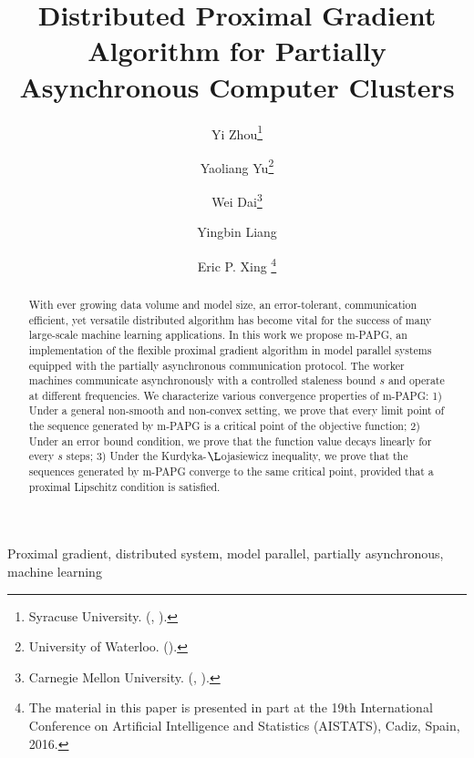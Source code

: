 \documentclass[leqno,onefignum,onetabnum]{siamart0516}
\title{Distributed Proximal Gradient Algorithm for Partially Asynchronous Computer Clusters}%
\author{Yi Zhou\thanks{Syracuse University. (\email{yzhou35@syr.edu}, \email{yliang06@syr.edu}).}  
   \and  Yaoliang Yu\thanks{University of Waterloo. (\email{yaoliang.yu@uwaterloo.ca}).} 
   \and  Wei Dai\thanks{Carnegie Mellon University. (\email{wdai@cs.cmu.edu}, \email{epxing@cs.cmu.edu}).} 
   \and  Yingbin Liang%
   \footnotemark[1]
   \and  Eric P. Xing%
   \footnotemark[3]
   \thanks{The material in this paper is presented in part at the 19th International Conference on Artificial Intelligence and Statistics (AISTATS), Cadiz, Spain, 2016.
   }  
}
\newcommand{\mspg}{\textsf{m-PAPG}\xspace}
\begin{document}
\maketitle

\begin{abstract}
With ever growing data volume and model size, an error-tolerant, communication efficient, yet versatile distributed algorithm has become vital for the success of many large-scale machine learning applications. In this work we propose \mspg, an implementation of the flexible proximal gradient algorithm in model parallel systems equipped with the partially asynchronous communication protocol. The worker machines communicate asynchronously with a controlled staleness bound $s$ and operate at different frequencies. We characterize various convergence properties of \mspg: 1) Under a general non-smooth and non-convex setting, we prove that every limit point of the sequence generated by \mspg is a critical point of the objective function; 2) Under an error bound condition, we prove that the function value decays linearly for every $s$ steps; 3) Under the Kurdyka-${\L}$ojasiewicz inequality, we prove that the sequences generated by \mspg converge to the same critical point, provided that a proximal Lipschitz condition is satisfied.
\end{abstract}

\begin{keywords}
	Proximal gradient, distributed system, model parallel, partially asynchronous, machine learning
\end{keywords}
\begin{AMS}\end{AMS}

\pagestyle{myheadings}
\thispagestyle{plain}


\end{document}

